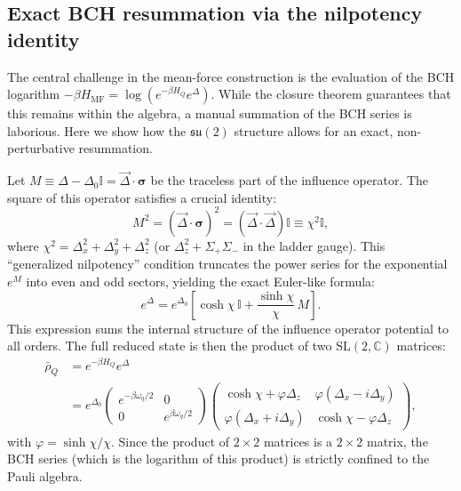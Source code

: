 \subsection{Exact BCH resummation via the nilpotency identity}
\label{appalg:bch_resummation}

The central challenge in the mean-force construction is the evaluation of the BCH logarithm $-\beta H_{\mathrm{MF}} = \log(e^{-\beta H_Q}e^\Delta)$. While the closure theorem guarantees that this remains within the algebra, a manual summation of the BCH series is laborious. Here we show how the $\mathfrak{su}(2)$ structure allows for an exact, non-perturbative resummation.

Let $M \equiv \Delta - \Delta_0\mathbb{I} = \vec{\Delta}\cdot\boldsymbol{\sigma}$ be the traceless part of the influence operator. The square of this operator satisfies a crucial identity:
\begin{equation}
    M^2 = (\vec{\Delta}\cdot\boldsymbol{\sigma})^2 = (\vec{\Delta}\cdot\vec{\Delta})\mathbb{I} \equiv \chi^2 \mathbb{I},
    \label{eq:M_squared_chi_appalg}
\end{equation}
where $\chi^2 = \Delta_x^2 + \Delta_y^2 + \Delta_z^2$ (or $\Delta_z^2 + \Sigma_+\Sigma_-$ in the ladder gauge). This ``generalized nilpotency'' condition truncates the power series for the exponential $e^M$ into even and odd sectors, yielding the exact Euler-like formula:
\begin{equation}
    e^\Delta = e^{\Delta_0}\left[ \cosh\chi\,\mathbb{I} + \frac{\sinh\chi}{\chi}\,M \right].
    \label{eq:expDelta_closed_appalg}
\end{equation}
This expression sums the internal structure of the influence operator potential to all orders. The full reduced state is then the product of two $\mathrm{SL}(2,\mathbb{C})$ matrices:
\begin{equation}
    \begin{split}
        \bar{\rho}_Q &= e^{-\beta H_Q}e^\Delta \\
        &= e^{\Delta_0} \begin{pmatrix} e^{-\beta\omega_q/2} & 0 \\ 0 & e^{\beta\omega_q/2} \end{pmatrix} 
        \begin{pmatrix} \cosh\chi + \varphi\Delta_z & \varphi(\Delta_x - i\Delta_y) \\ \varphi(\Delta_x + i\Delta_y) & \cosh\chi - \varphi\Delta_z \end{pmatrix},
    \end{split}
\end{equation}
with $\varphi=\sinh\chi/\chi$. Since the product of $2\times 2$ matrices is a $2\times 2$ matrix, the BCH series (which is the logarithm of this product) is strictly confined to the Pauli algebra.

